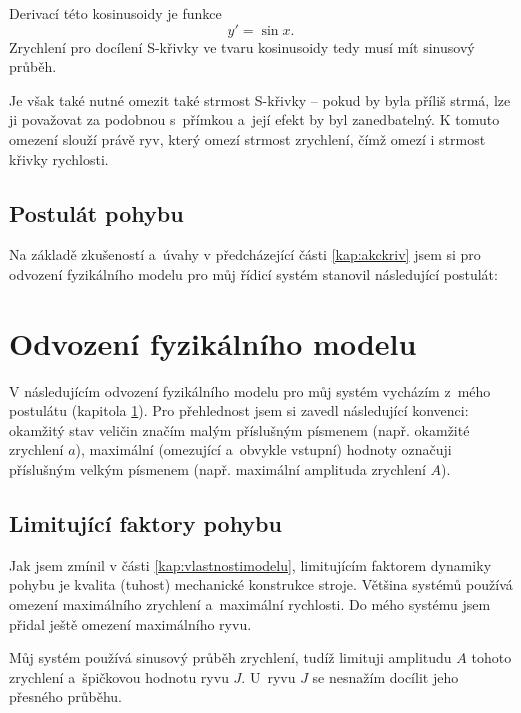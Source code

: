 	Derivací této kosinusoidy je funkce
	\begin{equation}
		y' = \sin x.
	\end{equation}
	Zrychlení pro docílení S-křivky ve tvaru kosinusoidy tedy musí mít sinusový průběh.
	
	Je však také nutné omezit také strmost S-křivky -- pokud by byla příliš strmá, lze ji považovat za podobnou s~přímkou a~její efekt by byl zanedbatelný. K tomuto omezení slouží právě ryv, který omezí strmost zrychlení, čímž omezí i strmost křivky rychlosti.
	
	\section{Postulát pohybu}\label{kap:postulat}
	
	Na základě zkušeností a~úvahy v předcházející části \ref{kap:akckriv} jsem si pro odvození fyzikálního modelu pro můj řídicí systém stanovil následující postulát:
	


\chapter{Odvození fyzikálního modelu}

	V následujícím odvození fyzikálního modelu pro můj systém vycházím z~mého postulátu (kapitola \ref{kap:postulat}). Pro přehlednost jsem si zavedl následující konvenci: okamžitý stav veličin značím malým příslušným písmenem (např. okamžité zrychlení $a$), maximální (omezující a~obvykle vstupní) hodnoty označuji příslušným velkým písmenem (např. maximální amplituda zrychlení $A$).

	\section{Limitující faktory pohybu}\label{kap:limitujicifaktory}
	
	Jak jsem zmínil v části \ref{kap:vlastnostimodelu}, limitujícím faktorem dynamiky pohybu je kvalita (tuhost) mechanické konstrukce stroje. Většina systémů používá omezení maximálního zrychlení a~maximální rychlosti. Do mého systému jsem přidal ještě omezení maximálního ryvu.
	
	Můj systém používá sinusový průběh zrychlení, tudíž limituji amplitudu $A$ tohoto zrychlení a~špičkovou hodnotu ryvu $J$. U~ryvu $J$ se nesnažím docílit jeho přesného průběhu. 
	
